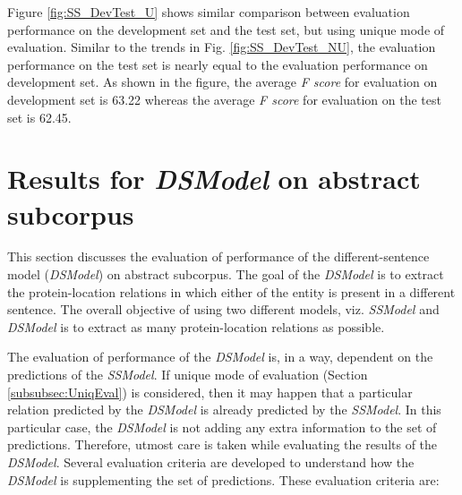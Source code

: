 Figure \ref{fig:SS_DevTest_U} shows similar comparison between evaluation performance on the development set and the test set, but using unique mode of evaluation. Similar to the trends in Fig. \ref{fig:SS_DevTest_NU}, the evaluation performance on the test set is nearly equal to the evaluation performance on development set. As shown in the figure, the average \textit{F score} for evaluation on development set is 63.22 whereas the average \textit{F score} for evaluation on the test set is 62.45.

\section{Results for \textit{DSModel} on abstract subcorpus}

This section discusses the evaluation of performance of the different-sentence model (\textit{DSModel}) on abstract subcorpus. The goal of the \textit{DSModel} is to extract the protein-location relations in which either of the entity is present in a different sentence. The overall objective of using two different models, viz. \textit{SSModel} and \textit{DSModel} is to extract as many protein-location relations as possible. 

The evaluation of performance of the \textit{DSModel} is, in a way, dependent on the predictions of the \textit{SSModel}. If unique mode of evaluation (Section \ref{subsubsec:UniqEval}) is considered, then it may happen that a particular relation predicted by the \textit{DSModel} is already predicted by the \textit{SSModel}. In this particular case, the \textit{DSModel} is not adding any extra information to the set of predictions. Therefore, utmost care is taken while evaluating the results of the \textit{DSModel}. Several evaluation criteria are developed to understand how the \textit{DSModel} is supplementing the set of predictions. These evaluation criteria are:


